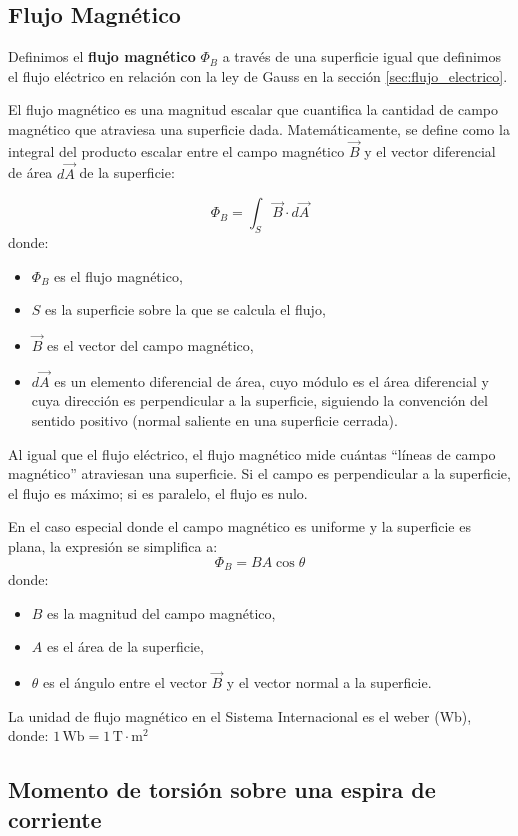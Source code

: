 \subsection{Flujo Magnético}

Definimos el \textbf{flujo magnético} \(\Phi_B\) a través de una superficie igual que definimos el flujo eléctrico en relación con la ley de Gauss en la sección \ref{sec:flujo_electrico}. 

El flujo magnético es una magnitud escalar que cuantifica la cantidad de campo magnético que atraviesa una superficie dada. Matemáticamente, se define como la integral del producto escalar entre el campo magnético \(\vec{B}\) y el vector diferencial de área \(d\vec{A}\) de la superficie:

\[
\Phi_B = \int_S \vec{B} \cdot d\vec{A}
\]
donde:
\begin{itemize}
  \item \(\Phi_B\) es el flujo magnético,
  \item \(S\) es la superficie sobre la que se calcula el flujo,
  \item \(\vec{B}\) es el vector del campo magnético,
  \item \(d\vec{A}\) es un elemento diferencial de área, cuyo módulo es el área diferencial y cuya dirección es perpendicular a la superficie, siguiendo la convención del sentido positivo (normal saliente en una superficie cerrada).
\end{itemize}

Al igual que el flujo eléctrico, el flujo magnético mide cuántas ``líneas de campo magnético'' atraviesan una superficie. Si el campo es perpendicular a la superficie, el flujo es máximo; si es paralelo, el flujo es nulo.

En el caso especial donde el campo magnético es uniforme y la superficie es plana, la expresión se simplifica a:
\[
\Phi_B = B A \cos\theta
\]
donde:
\begin{itemize}
  \item \(B\) es la magnitud del campo magnético,
  \item \(A\) es el área de la superficie,
  \item \(\theta\) es el ángulo entre el vector \(\vec{B}\) y el vector normal a la superficie.
\end{itemize}

La unidad de flujo magnético en el Sistema Internacional es el weber (Wb), donde: \(1 \, \text{Wb} = 1 \, \text{T} \cdot \text{m}^2\)

\subsection{Momento de torsión sobre una espira de corriente}

